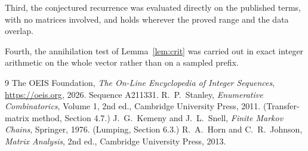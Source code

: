 \documentclass[11pt,a4paper]{article}
\theoremstyle{plain}
\theoremstyle{definition}
\begin{document}
Third, the conjectured recurrence was evaluated directly on the published terms, with no
matrices involved, and holds wherever the proved range and the data overlap.

Fourth, the annihilation test of Lemma~\ref{lem:crit} was carried out in exact integer
arithmetic on the whole vector rather than on a sampled prefix.

\begin{thebibliography}{9}
 The OEIS Foundation, \emph{The On-Line Encyclopedia of Integer
Sequences}, \url{https://oeis.org}, 2026. Sequence A211331.
 R.~P.~Stanley, \emph{Enumerative Combinatorics}, Volume 1, 2nd ed.,
Cambridge University Press, 2011. (Transfer-matrix method, Section 4.7.)
 J.~G.~Kemeny and J.~L.~Snell, \emph{Finite Markov Chains}, Springer, 1976.
(Lumping, Section 6.3.)
 R.~A.~Horn and C.~R.~Johnson, \emph{Matrix Analysis}, 2nd ed., Cambridge
University Press, 2013.
\end{thebibliography}
\end{document}

